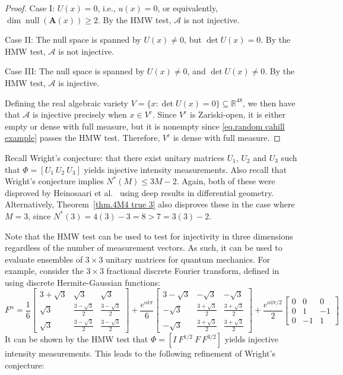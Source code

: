 \documentclass[times,10pt]{elsarticle}
\theoremstyle{plain}
\begin{document}
\begin{proof}
Case I: $U(x)=0$, i.e., $u(x)=0$, or equivalently, $\dim\operatorname{null}(\mathbf{A}(x))\geq2$.
By the HMW test, $\mathcal{A}$ is not injective.

Case II: The null space is spanned by $U(x)\neq0$, but $\det U(x)=0$.
By the HMW test, $\mathcal{A}$ is not injective.

Case III: The null space is spanned by $U(x)\neq0$, and $\det U(x)\neq0$.
By the HMW test, $\mathcal{A}$ is injective.

Defining the real algebraic variety $V=\{x:\det U(x)=0\}\subseteq\mathbb{R}^{48}$, we then have that $\mathcal{A}$ is injective precisely when $x\in V^\mathrm{c}$.
Since $V^\mathrm{c}$ is Zariski-open, it is either empty or dense with full measure, but it is nonempty since \eqref{eq.random cahill example} passes the HMW test.
Therefore, $V^\mathrm{c}$ is dense with full measure.
\qquad
\end{proof}

Recall Wright's conjecture: that there exist unitary matrices $U_1$, $U_2$ and $U_3$ such that $\Phi=[U_1~U_2~U_3]$ yields injective intensity measurements.
Also recall that Wright's conjecture implies $N^*(M)\leq3M-2$.
Again, both of these were disproved by Heinosaari et al.~\cite{HeinosaariMW:11} using deep results in differential geometry.
Alternatively, Theorem~\ref{thm.4M4 true 3} also disproves these in the case where $M=3$, since $N^*(3)=4(3)-3=8>7=3(3)-2$.

Note that the HMW test can be used to test for injectivity in three dimensions regardless of the number of measurement vectors.
As such, it can be used to evaluate ensembles of $3\times 3$ unitary matrices for quantum mechanics.
For example, consider the $3\times 3$ fractional discrete Fourier transform, defined in~\cite{CandanKO:00} using discrete Hermite-Gaussian functions:
\begin{equation*}
F^{\alpha}
=
\frac{1}{6}
\left[
\begin{array}{ccc}
3+\sqrt{3} & \sqrt{3} & \sqrt{3} \\
\sqrt{3} & \frac{3-\sqrt{3}}{2} & \frac{3-\sqrt{3}}{2} \\
\sqrt{3} & \frac{3-\sqrt{3}}{2} & \frac{3-\sqrt{3}}{2}
\end{array}
\right]
+
\frac{e^{\alpha \mathrm{i}\pi}}{6}
\left[
\begin{array}{ccc}
3-\sqrt{3} & -\sqrt{3} & -\sqrt{3} \\
-\sqrt{3} & \frac{3+\sqrt{3}}{2} & \frac{3+\sqrt{3}}{2} \\
-\sqrt{3} & \frac{3+\sqrt{3}}{2} & \frac{3+\sqrt{3}}{2}
\end{array}
\right]
+
\frac{e^{\alpha \mathrm{i}\pi/2}}{2}
\left[
\begin{array}{rrr}
0 & 0 & 0 \\
0 & 1 & -1\\
0 & -1 & 1
\end{array}
\right]
\end{equation*}
It can be shown by the HMW test that $\Phi=[I~F^{1/2}~F~F^{3/2}]$ yields injective intensity measurements.
This leads to the following refinement of Wright's conjecture:
\end{document}
